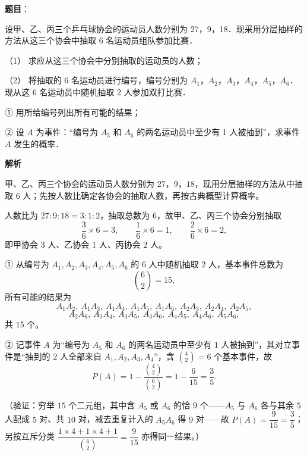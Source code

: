 \begin{answer}

\textbf{题目}：

设甲、乙、丙三个乒乓球协会的运动员人数分别为 27，9，18．现采用分层抽样的方法从这三个协会中抽取 6 名运动员组队参加比赛．

（1） 求应从这三个协会中分别抽取的运动员的人数；

（2） 将抽取的 6 名运动员进行编号，编号分别为 \(A_1\)，\(A_2\)，\(A_3\)，\(A_4\)，\(A_5\)，\(A_6\)．现从这 6 名运动员中随机抽取 2 人参加双打比赛．

① 用所给编号列出所有可能的结果；

② 设 \(A\) 为事件：“编号为 \(A_5\) 和 \(A_6\) 的两名运动员中至少有 1 人被抽到”，求事件 \(A\) 发生的概率．

\textbf{解析}

甲、乙、丙三个协会的运动员人数分别为 \(27\)，\(9\)，\(18\)，现用分层抽样的方法从中抽取 \(6\) 人；先按人数比确定各协会的抽取人数，再按古典概型计算概率。

人数比为 \(27:9:18=3:1:2\)，抽取总数为 \(6\)，故甲、乙、丙三个协会分别抽取
\nopagebreak[4]
\[
\dfrac{3}{6}\times 6=3,\qquad \dfrac{1}{6}\times 6=1,\qquad \dfrac{2}{6}\times 6=2,
\]
即甲协会 \(3\) 人、乙协会 \(1\) 人、丙协会 \(2\) 人。

① 从编号为 \(A_1,A_2,A_3,A_4,A_5,A_6\) 的 \(6\) 人中随机抽取 \(2\) 人，基本事件总数为
\nopagebreak[4]
\[
\binom{6}{2}=15,
\]
所有可能的结果为
\nopagebreak[4]
\[
A_1A_2,\ A_1A_3,\ A_1A_4,\ A_1A_5,\ A_1A_6,\ A_2A_3,\ A_2A_4,\ A_2A_5,
\]
\nopagebreak[4]
\[
A_2A_6,\ A_3A_4,\ A_3A_5,\ A_3A_6,\ A_4A_5,\ A_4A_6,\ A_5A_6,
\]
共 \(15\) 个。

② 记事件 \(A\) 为“编号为 \(A_5\) 和 \(A_6\) 的两名运动员中至少有 \(1\) 人被抽到”，其对立事件是“抽到的 \(2\) 人全部来自 \(A_1,A_2,A_3,A_4\)”，含 \(\binom{4}{2}=6\) 个基本事件，故
\nopagebreak[4]
\[
P(A)=1-\dfrac{\binom{4}{2}}{\binom{6}{2}}=1-\dfrac{6}{15}=\dfrac{3}{5}.
\]

（验证：穷举 \(15\) 个二元组，其中含 \(A_5\) 或 \(A_6\) 的恰 \(9\) 个——\(A_5\) 与 \(A_6\) 各与其余 \(5\) 人配成 \(5\) 对、共 \(10\) 对，减去重复计入的 \(A_5A_6\) 得 \(9\) 对——故 \(P(A)=\dfrac{9}{15}=\dfrac{3}{5}\)；另按互斥分类 \(\dfrac{1\times4+1\times4+1}{\binom{6}{2}}=\dfrac{9}{15}\) 亦得同一结果。）



\end{answer}
